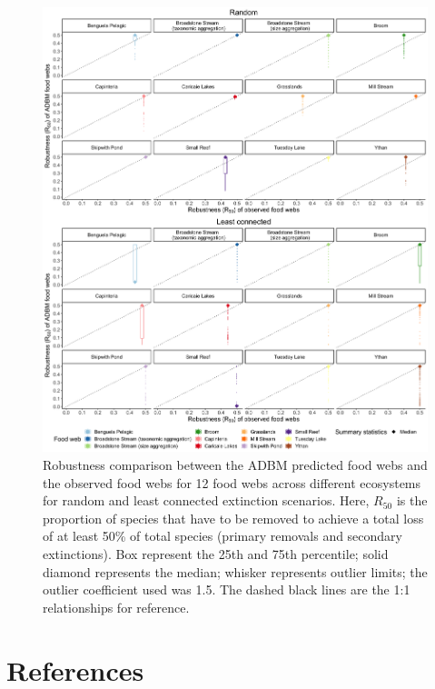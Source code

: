 \documentclass{article}
\begin{document}
\begin{figure}[H]

{\centering \includegraphics[width=450px]{../results/plot_R50_ADBM_vs_obs_ra_lc_facet} 

}

\caption{\label{fig:fig_a2} Robustness comparison between the ADBM predicted food webs and the observed food webs for 12 food webs across different ecosystems for random and least connected extinction scenarios. Here, $R_{50}$ is the proportion of species that have to be removed to achieve a total loss of at least 50\% of total species (primary removals and secondary extinctions). Box represent the 25th and 75th percentile; solid diamond represents the median; whisker represents outlier limits; the outlier coefficient used was 1.5. The dashed black lines are the 1:1 relationships for reference.}\label{fig:unnamed-chunk-8}
\end{figure}

\hypertarget{references}{%
\section*{References}\label{references}}
\end{document}
